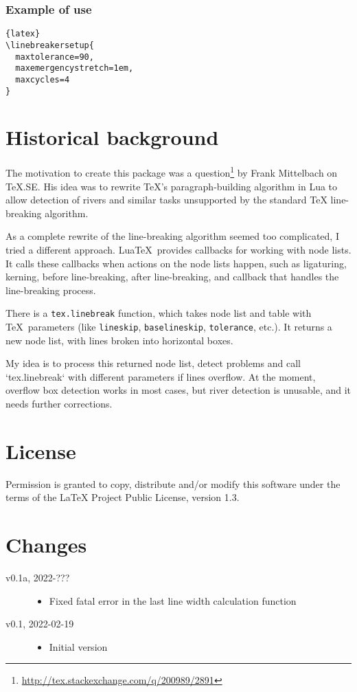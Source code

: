\documentclass{l3doc}
\begin{document}
\subsubsection{Example of \cmd{\linebreakersetup} use}

\begin{lstlisting}{latex}
\linebreakersetup{
  maxtolerance=90,
  maxemergencystretch=1em,
  maxcycles=4
}
\end{lstlisting}



\section{Historical background}

The motivation to create this package was a 
question\footnote{\url{http://tex.stackexchange.com/q/200989/2891}} by Frank Mittelbach on
TeX.SE. His idea was to rewrite TeX’s paragraph-building algorithm in Lua to
allow detection of rivers and similar tasks unsupported by the standard TeX
line-breaking algorithm.

As a complete rewrite of the line-breaking algorithm seemed too complicated, 
I tried a different approach. Lua\TeX\ provides  callbacks for working with node lists. 
It calls these callbacks when actions on the node lists happen, such as 
ligaturing, kerning, before line-breaking, after line-breaking, and 
callback that  handles the line-breaking process. 

There is a \verb|tex.linebreak| function, which takes
node list and table with \TeX\ parameters (like \verb|lineskip|, \verb|baselineskip|, \verb|tolerance|,
etc.). It returns a new node list, with lines broken into horizontal boxes.

My idea is to process this returned node list, detect problems and call
`tex.linebreak` with different parameters if lines overflow. At the
moment, overflow box detection works in most cases, but river detection is unusable, and it needs further corrections.

\section{License}

Permission is granted to copy, distribute and/or modify this software
under the terms of the LaTeX Project Public License, version 1.3.

\section{Changes}

\begin{description}
  \item[v0.1a, 2022-???]\hfill

    \begin{itemize}
      \item Fixed fatal error in the last line width calculation function
    \end{itemize}

  \item[v0.1, 2022-02-19]\hfill

    \begin{itemize}
      \item Initial version
    \end{itemize}
\end{description}
\end{document}
